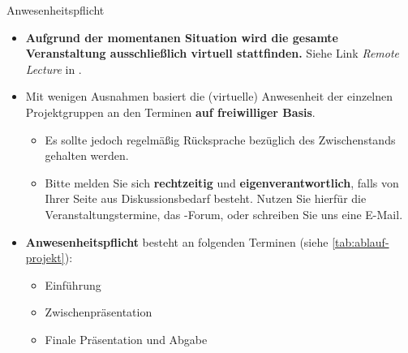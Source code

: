 \begin{dwHeaderFrame}{Anwesenheitspflicht}
	\begin{itemize}
		\item \textbf{Aufgrund der momentanen Situation wird die gesamte Veranstaltung ausschließlich virtuell stattfinden.}
			Siehe Link \textit{\glqq{}Remote Lecture\grqq{}} in \moodle.
		\item Mit wenigen Ausnahmen basiert die (virtuelle) Anwesenheit der einzelnen Projektgruppen an den Terminen \textbf{auf freiwilliger Basis}.
		\begin{itemize}
			\item Es sollte jedoch regelmäßig Rücksprache bezüglich des Zwischenstands gehalten werden.
			\item Bitte melden Sie sich \textbf{rechtzeitig} und \textbf{eigenverantwortlich},
				falls von Ihrer Seite aus Diskussionsbedarf besteht. Nutzen Sie hierfür die Veranstaltungstermine, das \moodle-Forum,
				oder schreiben Sie uns eine E-Mail.
		\end{itemize}
		\item \textbf{Anwesenheitspflicht} besteht an folgenden Terminen (siehe \cref{tab:ablauf-projekt}):
		\begin{itemize}
			\item Einführung
			\item Zwischenpräsentation
			\item Finale Präsentation und Abgabe
		\end{itemize}
	\end{itemize}
\end{dwHeaderFrame}


